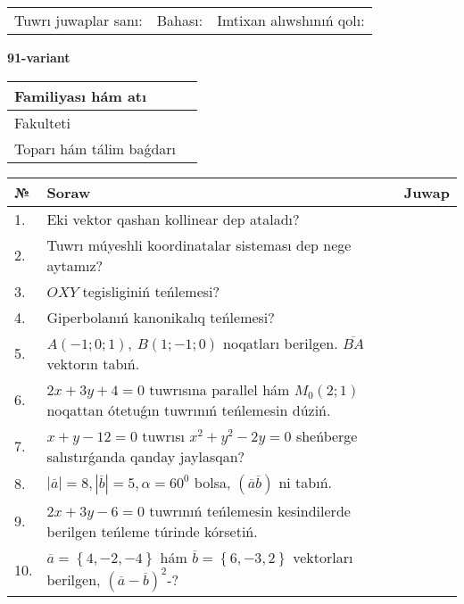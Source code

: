 \documentclass{article}
\begin{document}
\vspace{1cm}

\begin{tabular}{lll}
Tuwrı juwaplar sanı: \underline{\hspace{1.5cm}} & 
Bahası: \underline{\hspace{1.5cm}} & 
Imtixan alıwshınıń qolı: \underline{\hspace{2cm}} \\
\end{tabular}

\egroup

\newpage


\textbf{91-variant}\\

\bgroup
\def\arraystretch{1.6} %

\begin{tabular}{|m{5.7cm}|m{9.5cm}|}
\hline
Familiyası hám atı & \\
\hline
Fakulteti  & \\
\hline
Toparı hám tálim baǵdarı  & \\
\hline
\end{tabular}

\vspace{1cm}

\begin{tabular}{|m{0.7cm}|m{10cm}|m{4cm}|}
\hline
№ & Soraw & Juwap \\
\hline
1. & Eki vektor qashan kollinear dep ataladı? &  \\
\hline
2. & Tuwrı múyeshli koordinatalar sisteması dep nege aytamız? &  \\
\hline
3. & $OXY$ tegisliginiń teńlemesi? &  \\
\hline
4. & Giperbolanıń kanonikalıq teńlemesi? &  \\
\hline
5. & $A (-1;0;1),\ B (1;-1;0)$ noqatları berilgen. $\overline{BA}$ vektorın tabıń. &  \\
\hline
6. & $2x+3y+4=0$ tuwrısına parallel hám $M_{0} (2;1)$ noqattan ótetuǵın tuwrınıń teńlemesin dúziń. &  \\
\hline
7. & $x+y-12=0$ tuwrısı $x^{2}+y^{2}-2y=0$ sheńberge salıstırǵanda qanday jaylasqan? &  \\
\hline
8. & $\left| \overline{a} \right|=8, \left| \overline{b} \right|=5, \alpha=60^{0}$ bolsa, $( \overline{a}\overline{b} )$ ni tabıń. &  \\
\hline
9. & $2x+3y-6=0$ tuwrınıń teńlemesin kesindilerde berilgen teńleme túrinde kórsetiń. &  \\
\hline
10. & $\overline{a}=\left\{ 4,-2,-4 \right\}$ hám $\overline{b}=\left\{ 6,-3, 2 \right\}$ vektorları berilgen, $(\overline{a}-\overline{b}) ^{2}$-? &  \\
\hline
\end{tabular}
\end{document}
